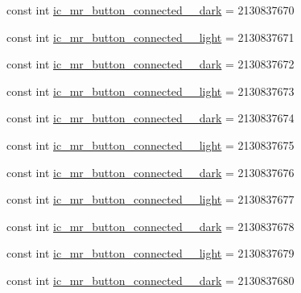 \begin{DoxyCompactItemize}
const int \mbox{\hyperlink{class_f_w_p_s___app_1_1_droid_1_1_resource_1_1_drawable_a394f27951fea38879c4a6647fb569e21}{ic\+\_\+mr\+\_\+button\+\_\+connected\+\_\+\_\+dark}} = 2130837670
\item 
const int \mbox{\hyperlink{class_f_w_p_s___app_1_1_droid_1_1_resource_1_1_drawable_ab5aafc3b5660baaf5ab8b2ca3ea3d5b3}{ic\+\_\+mr\+\_\+button\+\_\+connected\+\_\+\_\+light}} = 2130837671
\item 
const int \mbox{\hyperlink{class_f_w_p_s___app_1_1_droid_1_1_resource_1_1_drawable_a9388f1e0f84982b1a974bf11678ae969}{ic\+\_\+mr\+\_\+button\+\_\+connected\+\_\+\_\+dark}} = 2130837672
\item 
const int \mbox{\hyperlink{class_f_w_p_s___app_1_1_droid_1_1_resource_1_1_drawable_aa3d43ff368fb78c03aafb4eb007a3972}{ic\+\_\+mr\+\_\+button\+\_\+connected\+\_\+\_\+light}} = 2130837673
\item 
const int \mbox{\hyperlink{class_f_w_p_s___app_1_1_droid_1_1_resource_1_1_drawable_aa1b218bae58b79f559050562687369c9}{ic\+\_\+mr\+\_\+button\+\_\+connected\+\_\+\_\+dark}} = 2130837674
\item 
const int \mbox{\hyperlink{class_f_w_p_s___app_1_1_droid_1_1_resource_1_1_drawable_ab94c3db3ec81f6c59d81667791c507a9}{ic\+\_\+mr\+\_\+button\+\_\+connected\+\_\+\_\+light}} = 2130837675
\item 
const int \mbox{\hyperlink{class_f_w_p_s___app_1_1_droid_1_1_resource_1_1_drawable_ae278fd3fdc48f8bd03f12545380447bd}{ic\+\_\+mr\+\_\+button\+\_\+connected\+\_\+\_\+dark}} = 2130837676
\item 
const int \mbox{\hyperlink{class_f_w_p_s___app_1_1_droid_1_1_resource_1_1_drawable_ab199453dbf6854fbdbb85aeda95fe44e}{ic\+\_\+mr\+\_\+button\+\_\+connected\+\_\+\_\+light}} = 2130837677
\item 
const int \mbox{\hyperlink{class_f_w_p_s___app_1_1_droid_1_1_resource_1_1_drawable_ae29870f034b79c62b246602690c99c9e}{ic\+\_\+mr\+\_\+button\+\_\+connected\+\_\+\_\+dark}} = 2130837678
\item 
const int \mbox{\hyperlink{class_f_w_p_s___app_1_1_droid_1_1_resource_1_1_drawable_a8e526c587e0ad13e8e334f35a6a424cc}{ic\+\_\+mr\+\_\+button\+\_\+connected\+\_\+\_\+light}} = 2130837679
\item 
const int \mbox{\hyperlink{class_f_w_p_s___app_1_1_droid_1_1_resource_1_1_drawable_aa9354373d9ad7fe6a490b317158cff8c}{ic\+\_\+mr\+\_\+button\+\_\+connected\+\_\+\_\+dark}} = 2130837680
\item 

\end{DoxyCompactItemize}
